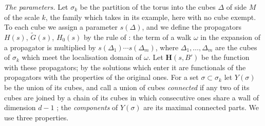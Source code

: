 \documentclass[11pt]{preprint}
\numberwithin{equation}{section}
\theoremstyle{definition}
\theoremstyle{remark}
\theoremstyle{plain}
\begin{document}
\emph{The parameters.} Let $\sigma_k$ be the partition of the torus into the cubes $\Delta$ of side $M$ of the scale $k$, the family which \cite[p.~3]{BalabanRG2} takes in its example, here with no cube exempt. To each cube we assign a parameter $s(\Delta)$, and we define the propagators $H(s)$, $\tilde G(s)$, $H_0(s)$ by the rule of \cite[p.~3]{BalabanRG2}: the term of a walk $\omega$ in the expansion \cite[(1.6)]{BalabanRG2} of a propagator is multiplied by $s(\Delta_1) \cdots s(\Delta_m)$, where $\Delta_1, \dots, \Delta_m$ are the cubes of $\sigma_k$ which meet the localisation domain of $\omega$. Let $\mathbf H(s, B')$ be the function \cite[(1.17)]{BalabanRG2} with these propagators; by \cite[(1.5), p.~3]{BalabanRG2} the solutions which enter it are functionals of the propagators with the properties of the original ones. For a set $\sigma \subset \sigma_k$ let $Y(\sigma)$ be the union of its cubes, and call a union of cubes \emph{connected} if any two of its cubes are joined by a chain of its cubes in which consecutive ones share a wall of dimension $d - 1$ \cite[p.~4]{BalabanRG2}; the \emph{components} of $Y(\sigma)$ are its maximal connected parts. We use three properties.
\end{document}
